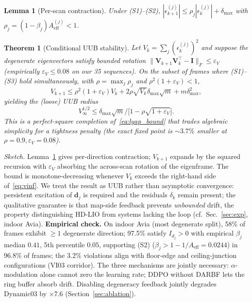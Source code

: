 \documentclass[conference]{IEEEtran}
\newcommand{\bvec}[1]{\mathbf{#1}}
\newtheorem{lemma}{Lemma}
\newtheorem{theorem}{Theorem}
\begin{document}
\begin{lemma}[Per-scan contraction]\label{lem:contraction}
Under \textup{(S1)--(S2)},
$|\epsilon_{k+1}^{(j)}|{\le}\rho_j|\epsilon_k^{(j)}|{+}\delta_\mathrm{max}$
with $\rho_j{=}(1{-}\beta_j)A_\mathrm{eff}^{(j)}{<}1$.
\end{lemma}

\begin{theorem}[Conditional UUB stability]\label{thm:uub}
Let $V_k{=}\sum_j(\epsilon_k^{(j)})^2$ and suppose the degenerate
eigenvectors satisfy bounded rotation
$\|\bvec{V}_{k+1}\bvec{V}_k^\top{-}\bvec{I}\|_F{\le}\varepsilon_V$
(empirically $\varepsilon_V{\le}0.08$ on our 35 sequences). On the
subset of frames where \textup{(S1)--(S3)} hold simultaneously, with
$\rho{=}\max_j\rho_j$ and $\rho^2(1{+}\varepsilon_V){<}1$,
\begin{equation}\label{eq:lyap_bound}
  V_{k+1}{\le}\rho^2(1{+}\varepsilon_V)V_k
          + 2\rho\sqrt{V_k}\delta_\mathrm{max}\sqrt{m}
          + m\delta_\mathrm{max}^2,
\end{equation}
yielding the (loose) UUB radius
\begin{equation}\label{eq:vinf}
  V_\infty^{1/2} \le
  \delta_\mathrm{max}\sqrt{m}/\bigl[1-\rho\sqrt{1{+}\varepsilon_V}\bigr].
\end{equation}
This is a perfect-square completion of~\eqref{eq:lyap_bound} that
trades algebraic simplicity for a tightness penalty (the exact
fixed point is ${\sim}3.7\%$ smaller at $\rho{=}0.9,\varepsilon_V{=}0.08$).
\end{theorem}

\textit{Sketch.}
Lemma~\ref{lem:contraction} gives per-direction contraction; $V_{k+1}$
expands by the squared recursion with $\varepsilon_V$ absorbing the
across-scan rotation of the eigenframe. The bound is
monotone-decreasing whenever $V_k$ exceeds the right-hand side
of~\eqref{eq:vinf}. We treat the result as UUB rather than asymptotic
convergence: persistent excitation of $\bvec{d}_j$ is required and
the residuals $\delta_k$ remain present; the qualitative guarantee is
that map-side feedback prevents \emph{unbounded} drift, the property
distinguishing HD-LIO from systems lacking the loop (cf.\
Sec.~\ref{sec:exp}, indoor Avia).
\textbf{Empirical check.} On indoor Avia (most degenerate split),
58\% of frames exhibit $\ge 1$ degenerate direction; 97.5\% satisfy
$I_{d_j}{>}0$ with empirical $\beta_j$ median $0.41$, 5th percentile
$0.05$, supporting (S2) ($\beta_j{>}1{-}1/A_\mathrm{eff}{=}0.0244$) in 96.8\% of frames; the
3.2\% violations align with floor-edge and ceiling-junction
configurations (VI03 corridor).
The three mechanisms are jointly necessary: $\alpha$-modulation alone
cannot zero the learning rate; DDPO without DARBF lets the ring buffer
absorb drift. Disabling degeneracy feedback jointly degrades
Dynamic03 by $\times$7.6 (Section~\ref{sec:ablation}).
\end{document}
